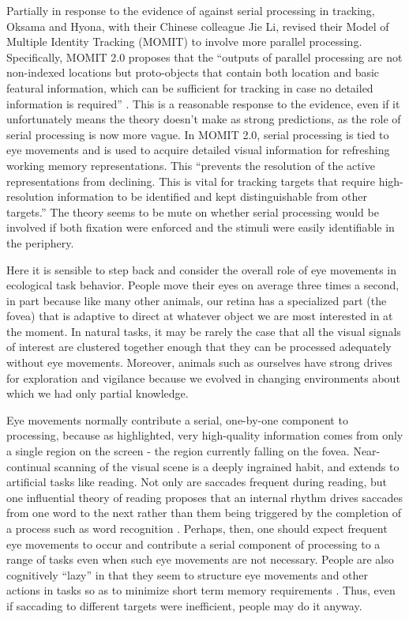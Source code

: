 \documentclass[
]{book}
\begin{document}
Partially in response to the evidence of \citet{howeIdentityLocationBindingProblem2015a} against serial processing in tracking, Oksama and Hyona, with their Chinese colleague Jie Li, revised their Model of Multiple Identity Tracking (MOMIT) to involve more parallel processing. Specifically, MOMIT 2.0 proposes that the ``outputs of parallel processing are not non-indexed locations but proto-objects that contain both location and basic featural information, which can be sufficient for tracking in case no detailed information is required'' \citep{liModelMultipleIdentity2019}. This is a reasonable response to the evidence, even if it unfortunately means the theory doesn't make as strong predictions, as the role of serial processing is now more vague. In MOMIT 2.0, serial processing is tied to eye movements and is used to acquire detailed visual information for refreshing working memory representations. This ``prevents the resolution of the active representations from declining. This is vital for tracking targets that require high-resolution information to be identified and kept distinguishable from other targets.'' The theory seems to be mute on whether serial processing would be involved if both fixation were enforced and the stimuli were easily identifiable in the periphery.

Here it is sensible to step back and consider the overall role of eye movements in ecological task behavior. People move their eyes on average three times a second, in part because like many other animals, our retina has a specialized part (the fovea) that is adaptive to direct at whatever object we are most interested in at the moment. In natural tasks, it may be rarely the case that all the visual signals of interest are clustered together enough that they can be processed adequately without eye movements. Moreover, animals such as ourselves have strong drives for exploration and vigilance because we evolved in changing environments about which we had only partial knowledge.

Eye movements normally contribute a serial, one-by-one component to processing, because as \citet{liModelMultipleIdentity2019} highlighted, very high-quality information comes from only a single region on the screen - the region currently falling on the fovea. Near-continual scanning of the visual scene is a deeply ingrained habit, and extends to artificial tasks like reading. Not only are saccades frequent during reading, but one influential theory of reading proposes that an internal rhythm drives saccades from one word to the next rather than them being triggered by the completion of a process such as word recognition \citep{engbertDynamicalModelSaccade2002}. Perhaps, then, one should expect frequent eye movements to occur and contribute a serial component of processing to a range of tasks even when such eye movements are not necessary. People are also cognitively ``lazy'' in that they seem to structure eye movements and other actions in tasks so as to minimize short term memory requirements \citep{hayhoeTaskConstraintsVisual1998}. Thus, even if saccading to different targets were inefficient, people may do it anyway.
\end{document}
